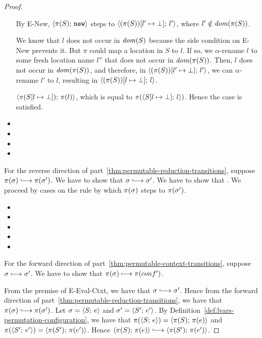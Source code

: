 \begin{proof}
\begin{itemize}
      By {\sc E-New}, $\langle \pi(S);\, \mbox{\texttt{new}} \rangle$ steps to
      $\langle (\pi(S))[l' \mapsto \bot];\, l' \rangle$, where $l' \notin
      \mathit{dom}(\pi(S))$.

      We know that $l$ does not occur in $\mathit{dom}(S)$ because the side
      condition on {\sc E-New} prevents it.  But $\pi$ could map a
      location in $S$ to $l$.  If so, we $\alpha$-rename $l$ to some
      fresh location name $l''$ that does not occur in $\mathit{dom}(\pi(S))$.
      Then, $l$ does not occur in $\mathit{dom}(\pi(S))$, and therefore, in
      $\langle (\pi(S))[l' \mapsto \bot];\, l' \rangle$, we can
      $\alpha$-rename $l'$ to $l$, resulting in
      $\langle (\pi(S))[l \mapsto \bot];\, l \rangle$.


      $\langle \pi(S[l \mapsto \bot]);\, \pi(l) \rangle$, which is equal to
      $\pi(\langle S[l \mapsto \bot];\, l \rangle)$.  Hence the case is
      satisfied.

    \item {}
    \item {}
    \item {}
    \item {}
  \end{itemize}

  For the reverse direction of
  part~\ref{thm:permutable-reduction-transitions}, suppose $\pi(\conf)
  \parstepsto \pi(\conf')$.  We have to show that $\conf \parstepsto
  \conf'$.  We have to show that .  We proceed by cases on the rule by
  which $\pi(\sigma)$ steps to $\pi(\sigma')$.

  \begin{itemize}
    \item {}
    \item {}
    \item {}
    \item {}
    \item {}
  \end{itemize}

  For the forward direction of
  part~\ref{thm:permutable-context-transitions}, suppose $\sigma
  \longmapsto \sigma'$.  We have to show that $\pi(\sigma) \longmapsto
  \pi(conf')$.

  From the premise of {\sc E-Eval-Ctxt}, we have that $\conf
  \parstepsto \conf'$.  Hence from the forward direction of
  part~\ref{thm:permutable-reduction-transitions}, we have that
  $\pi(\conf) \parstepsto \pi(\conf')$.  Let $\sigma = \langle S;\, e \rangle$
  and $\sigma' = \langle S';\, e' \rangle$.  By
  Definition~\ref{def:lvars-permutation-configuration}, we have that
  $\pi(\langle S;\, e \rangle) = \langle \pi(S);\, \pi(e) \rangle$ and
  $\pi(\langle S';\, e' \rangle) = \langle \pi(S');\, \pi(e') \rangle$.  Hence
  $\config{\pi(S)}{\pi(e)} \parstepsto \config{\pi(S')}{\pi(e')}$.


\end{proof}
